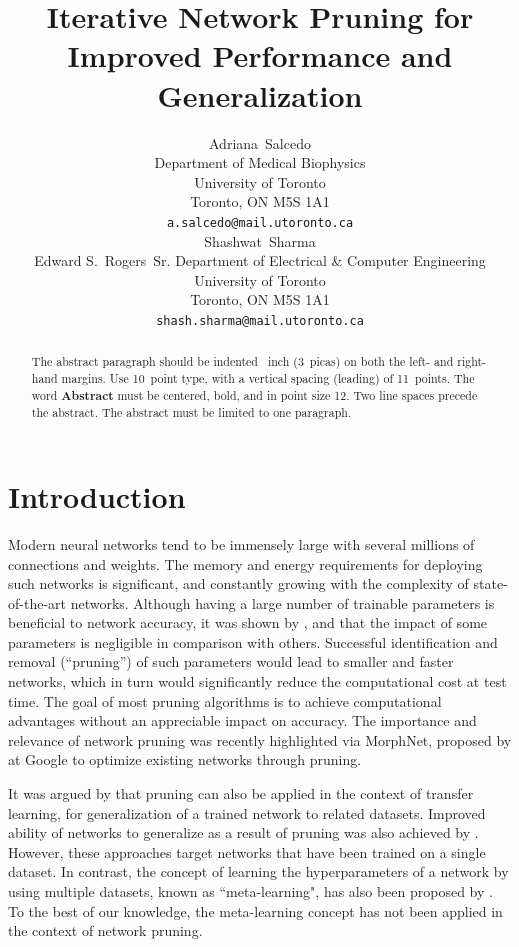 \documentclass{article}
\title{Iterative Network Pruning for Improved Performance and Generalization}
\author{%
  Adriana~Salcedo\\
  Department of Medical Biophysics\\
  University of Toronto\\
  Toronto, ON M5S 1A1\\
  \texttt{a.salcedo@mail.utoronto.ca} \\
   \And
   Shashwat~Sharma\\
   Edward S.~Rogers~Sr. Department of Electrical \& Computer Engineering \\
   University of Toronto\\
   Toronto, ON M5S 1A1\\
   \texttt{shash.sharma@mail.utoronto.ca} \\
}
\begin{document}

\maketitle

\begin{abstract}
  The abstract paragraph should be indented ~inch (3~picas) on
  both the left- and right-hand margins. Use 10~point type, with a vertical
  spacing (leading) of 11~points.  The word \textbf{Abstract} must be centered,
  bold, and in point size 12. Two line spaces precede the abstract. The abstract
  must be limited to one paragraph.
\end{abstract}

\section{Introduction}

Modern neural networks tend to be immensely large with several millions of connections and weights. The memory and energy requirements for deploying such networks is significant, and constantly growing with the complexity of state-of-the-art networks. Although having a large number of trainable parameters is beneficial to network accuracy, it was shown by \citet{NIPS_learning_weights_pruning}, \citet{OBD} and \citet{OBS} that the impact of some parameters is negligible in comparison with others. Successful identification and removal (``pruning'') of such parameters would lead to smaller and faster networks, which in turn would significantly reduce the computational cost at test time. The goal of most pruning algorithms is to achieve computational advantages without an appreciable impact on accuracy. The importance and relevance of network pruning was recently highlighted via MorphNet, proposed by \citet{morphnet} at Google to optimize existing networks through pruning.

It was argued by \citet{prune_transfer_learning} that pruning can also be applied in the context of transfer learning, for generalization of a trained network to related datasets. Improved ability of networks to generalize as a result of pruning was also achieved by \citet{prune_for_architecture}. However, these approaches target networks that have been trained on a single dataset. In contrast, the concept of learning the hyperparameters of a network by using multiple datasets, known as ``meta-learning", has also been proposed by \citet{metalearning1}. To the best of our knowledge, the meta-learning concept has not been applied in the context of network pruning.
\end{document}
